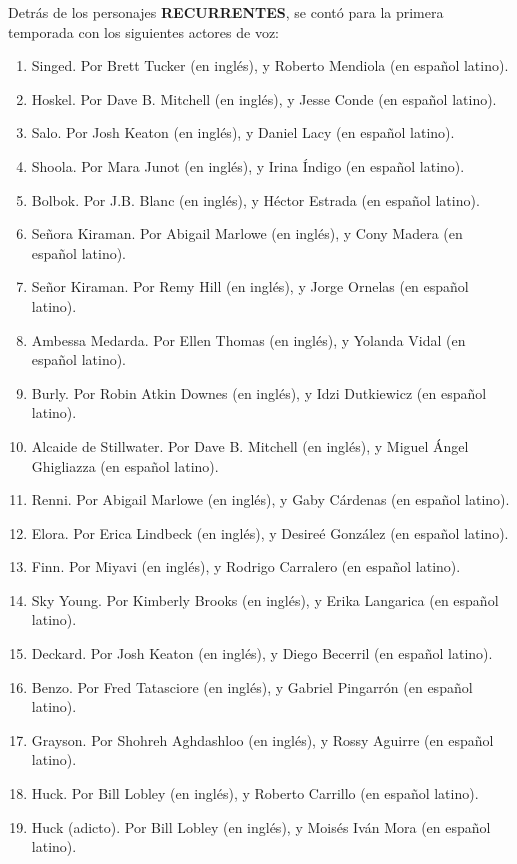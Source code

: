 \documentclass[11pt,A5]{article}
\begin{document}
Detrás de los personajes {\textbf{RECURRENTES}}, se contó para la primera temporada con los siguientes actores de voz:

\begin{enumerate}
    \item Singed. Por Brett Tucker (en inglés), y Roberto Mendiola (en español latino).
    \item Hoskel. Por Dave B. Mitchell (en inglés), y Jesse Conde (en español latino).
    \item Salo. Por Josh Keaton (en inglés), y Daniel Lacy	 (en español latino).
    \item Shoola. Por Mara Junot (en inglés), y Irina Índigo (en español latino).
    \item Bolbok. Por J.B. Blanc (en inglés), y Héctor Estrada (en español latino).
    \item Señora Kiraman. Por Abigail Marlowe (en inglés), y Cony Madera (en español latino).
    \item Señor Kiraman. Por Remy Hill (en inglés), y Jorge Ornelas (en español latino).
    \item Ambessa Medarda. Por Ellen Thomas (en inglés), y Yolanda Vidal (en español latino).
    \item Burly. Por Robin Atkin Downes (en inglés), y Idzi Dutkiewicz (en español latino).
    \item Alcaide de Stillwater. Por Dave B. Mitchell (en inglés), y Miguel Ángel Ghigliazza (en español latino).
    \item Renni. Por Abigail Marlowe (en inglés), y Gaby Cárdenas (en español latino).
    \item Elora. Por Erica Lindbeck (en inglés), y Desireé González (en español latino).
    \item Finn. Por Miyavi (en inglés), y Rodrigo Carralero (en español latino).
    \item Sky Young. Por Kimberly Brooks (en inglés), y Erika Langarica (en español latino).
    \item Deckard. Por Josh Keaton (en inglés), y Diego Becerril (en español latino).
    \item Benzo. Por Fred Tatasciore (en inglés), y Gabriel Pingarrón (en español latino).
    \item Grayson. Por Shohreh Aghdashloo (en inglés), y Rossy Aguirre (en español latino).
    \item Huck. Por Bill Lobley (en inglés), y Roberto Carrillo (en español latino).
    \item Huck (adicto). Por Bill Lobley (en inglés), y Moisés Iván Mora (en español latino).
\end{enumerate}
\end{document}

